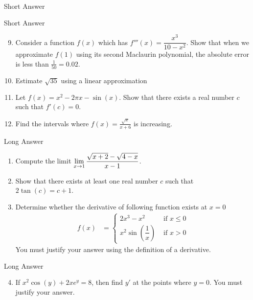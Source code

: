 {\begin{frame}[t]{Short Answer}
\begin{enumerate}[S1.]
\vfill
\end{enumerate}
\end{frame}
\begin{frame}[t]{Short Answer}
\begin{enumerate}[S1.]
\setcounter{enumi}{8}

%
\item \label{S9}  Consider a function $f(x)$ which has $f'''(x)=\dfrac{x^3}{10-x^2}$.
Show 
that when we approximate $f(1)$ using its second Maclaurin polynomial, the 
absolute error is less than $\frac{1}{50}=0.02$.   \hfill{}
\vfill
%
\item  \label{S10}  Estimate $\sqrt{35}$ using a linear approximation   \hfill{}
\vfill
%
\item \label{S11}  Let $f(x)=x^2-2\pi x - \sin(x)$. Show that there exists a real number $c$ such that $f'(c)=0$.
  \hfill{}
\vfill
%
\item  \label{S12}  Find the intervals where $f(x)=\frac{\sqrt{x}}{x+6}$ is increasing.
  \hfill{}
\vfill
%
\end{enumerate}
\end{frame}

\begin{frame}{Long Answer}
\AnswerYes
\begin{enumerate}[L1.]
\item  \label{L1}
Compute the limit $\displaystyle \lim_{x\to 1} \frac{\sqrt{x+2}-\sqrt{4-x}}{x-1}$. \hfill{}
\vfill

\item \label{L2}
Show that there exists at least one real number $c$ such that
$2\tan(c)=c+1$.  \hfill{}
\vfill

\item \label{L3}
Determine whether the derivative of following function exists at
$x=0$
\begin{align*}
f(x) &=\begin{cases}
  2x^3-x^2 & \text{ if }  x\le 0\\
  x^2\sin\left(\dfrac{1}{x}\right) & \text{ if } x> 0
\end{cases}
\end{align*}
You must justify your answer using the definition of a derivative.

 \hfill{}
\vfill
\end{enumerate}
\end{frame}
\begin{frame}{Long Answer}
\AnswerYes
\begin{enumerate}[L1.]
\setcounter{enumi}{3}
\item \label{L4}
If $x^2\cos(y)+2xe^y = 8$, then find $y'$ at the points where $y=0$.
You must justify your answer.
 \hfill{}
\vfill


\end{enumerate}
\end{frame}}
